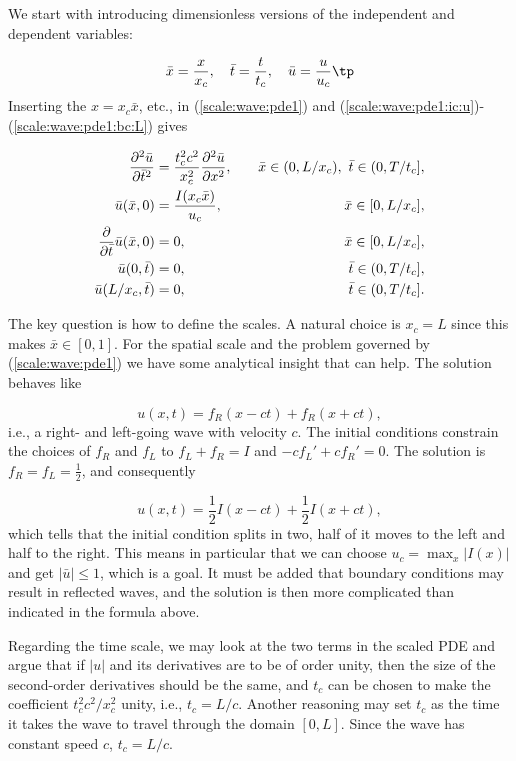 \documentclass[graybox,envcountchap,sectrefs,final]{svmonodo}
\begin{document}
We start with introducing dimensionless versions of the independent and
dependent variables:

\[
\bar x = \frac{x}{x_c},\quad \bar t=\frac{t}{t_c},\quad\bar u=\frac{u}{u_c}
\tp
\]
Inserting the $x=x_c\bar x$, etc., in (\ref{scale:wave:pde1}) and
(\ref{scale:wave:pde1:ic:u})-(\ref{scale:wave:pde1:bc:L}) gives

\begin{align*}
\frac{\partial^2 \bar u}{\partial \bar t^2} &=
\frac{t_c^2c^2}{x_c^2}{\partial^2 \bar u\over\partial x^2}, \quad & \bar x\in (0,L/x_c),\ \bar t\in (0,T/t_c],
\\ 
\bar u(\bar x,0) &= \frac{I(x_c\bar x)}{u_c},
\quad &\bar x\in [0,L/x_c],
\\ 
\frac{\partial}{\partial \bar t}\bar u(\bar x,0) &= 0,
\quad & \bar x\in [0,L/x_c],
\\ 
\bar u(0,\bar t) & = 0,
\quad  & \bar t\in (0,T/t_c],
\\ 
\bar u(L/x_c,\bar t) & = 0,
\quad &\bar t\in (0,T/t_c].
\end{align*}

The key question is how to define the scales.
A natural choice is $x_c=L$ since this makes $\bar x\in [0,1]$.
For the spatial scale and the problem governed by
(\ref{scale:wave:pde1}) we
have some analytical insight that can help.
The solution behaves like

\begin{equation}
u(x,t) = f_R(x-ct) + f_R(x+ct),
\label{scale:wave:pde:sol:general}
\end{equation}
i.e., a right- and left-going wave with velocity $c$. The initial
conditions constrain the choices of $f_R$ and $f_L$ to $f_L + f_R=I$
and $-cf_L' + cf_R' = 0$. The solution is $f_R = f_L = \frac{1}{2}$,
and consequently

\[
u(x,t) = \frac{1}{2}I(x-ct) + \frac{1}{2}I(x+ct),
\]
which tells that the initial condition splits in two, half of it moves
to the left and half to the right.
This means in particular that we can choose $u_c=\max_x |I(x)|$
and get $|\bar u|\leq 1$, which is a goal. It must be added that
boundary conditions may result in reflected waves, and the solution is
then more complicated than indicated in the formula above.

Regarding the time scale, we may look at the two terms in the scaled
PDE and argue that if $|u|$ and its derivatives are to be of order unity,
then the size of the second-order derivatives should be the same, and
$t_c$ can be chosen to make the coefficient $t_c^2 c^2 /x_c^2$ unity,
i.e., $t_c=L/c$.
Another reasoning may set $t_c$ as the time it takes the wave
to travel through the domain $[0,L]$. Since the wave has constant
speed $c$, $t_c = L/c$.
\end{document}
